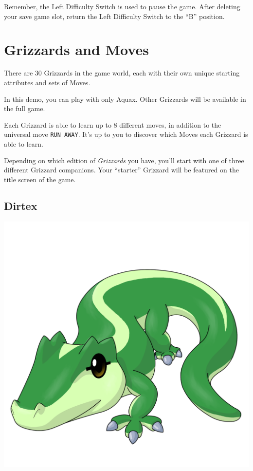 \documentclass[10pt,twocolumn,openany,article]{memoir}
\begin{document}
\begin{description}
Remember,  the  Left  Difficulty  Switch  is used  to  pause  the  game.
After deleting your save game slot, return the Left Difficulty Switch to
the ``B'' position.

\fi

\if %
\chapter{Grizzards and Moves}

There are  30 Grizzards in  the game world,  each with their  own unique
starting attributes and sets of Moves.

\ifdefined\DEMO

In this  demo, you  can play  with only Aquax.  Other Grizzards  will be
available in the full game.

\fi

Each Grizzard is able  to learn up to 8 different  moves, in addition to
the universal move  \texttt{RUN AWAY}. It's up to you  to discover which
Moves each  Grizzard is  able to  learn.

\ifdefined\DEMO\else

Depending on which edition of  \textit{Grizzards} you have, you'll start
with  one  of  three  different Grizzard  companions.  Your  ``starter''
Grizzard will be featured on the title screen of the game.

\section{Dirtex}

\includegraphics[width=\columnwidth]{../Manual/Dirtex.png}


\end{description}
\end{document}
